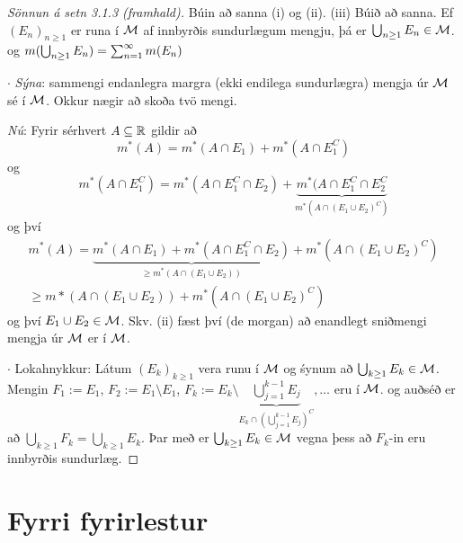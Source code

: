 \documentclass[12pt]{book} \usepackage[utf8]{inputenc}
\begin{document}
        \begin{proof}[Sönnun á setn 3.1.3 (framhald)]

          Búin að sanna (i) og (ii). (iii) Búið að sanna. Ef
          $(E_n)_{n \geq 1}$ er runa í $\mathcal{M}$ af innbyrðis
          sundurlægum mengju, þá er
          $\bigcup_{n \geq 1} E_n \in \mathcal{M}$.  og
          $m(\bigcup_{n \geq 1} E_n) = \sum_{n = 1}^{\infty} m (E_n)$

          $\cdot$ \emph{Sýna}: sammengi endanlegra margra (ekki
          endilega sundurlægra) mengja úr $\mathcal{M}$ sé í $\mathcal{M}$.  Okkur
          nægir að skoða tvö mengi.

          \emph{Nú}: Fyrir sérhvert $A \subseteq \mathbb{R}$ gildir
          að \[m^*(A) = m^*(A \cap E_1) + m^*(A \cap E_1^C)\]
          og
          \[m^*(A \cap E_1^C) = m^*(A \cap E_1^C \cap E_2) +
          \underbrace{m^*(A \cap E_1^C \cap E_2^C}_{m^*(A \cap
            (E_1 \cup E_2)^C)}\] og því
          \begin{gather*}
            m^*(A) = \underbrace{m^*(A \cap E_1) + m^*(A \cap
              E_1^C \cap
              E_2)}_{\geq m^*(A \cap (E_1 \cup E_2))} + m^*(A \cap (E_1 \cup E_2)^C)\\
            \geq m*(A \cap (E_1 \cup E_2)) + m^*(A \cap (E_1 \cup
            E_2)^C)
          \end{gather*}
          og því $E_1 \cup E_2 \in \mathcal{M}$.  Skv. (ii) fæst því (de
          morgan) að enandlegt sniðmengi mengja úr $\mathcal{M}$ er í
          $\mathcal{M}$.

          $\cdot$ Lokahnykkur: Látum $(E_k)_{k \geq 1}$ vera runu
          í $\mathcal{M}$ og śynum að $\bigcup_{k \geq 1} E_k \in
          \mathcal{M}$.
          Mengin $F_1 := E_1$, $F_2 := E_1 \setminus E_1$,
          $F_k := E_k \setminus \underbrace{\bigcup_{j=1}^{k-1}
            E_j}_{E_k \cap (\bigcup_{j=1}^{k-1} E_j)^C}, \dotsc$
          eru í $\mathcal{M}$.  og auðséð er að
          $\bigcup_{k \geq 1} F_k = \bigcup_{k \geq 1} E_k$. Þar
          með er $\bigcup_{k \geq 1} E_k \in \mathcal{M}$ vegna þess að
          $F_k$-in eru innbyrðis sundurlæg.
        \end{proof}

        \section{Fyrri fyrirlestur}
\end{document}
